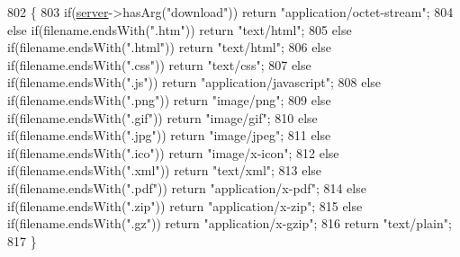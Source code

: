 \begin{DoxyCode}
802                                                  \{
803   \textcolor{keywordflow}{if}(\hyperlink{class_wi_fi_manager_a509523a01c0395cf0dc235b074f2a5ea}{server}->hasArg(\textcolor{stringliteral}{"download"})) \textcolor{keywordflow}{return} \textcolor{stringliteral}{"application/octet-stream"};
804   \textcolor{keywordflow}{else} \textcolor{keywordflow}{if}(filename.endsWith(\textcolor{stringliteral}{".htm"})) \textcolor{keywordflow}{return} \textcolor{stringliteral}{"text/html"};
805   \textcolor{keywordflow}{else} \textcolor{keywordflow}{if}(filename.endsWith(\textcolor{stringliteral}{".html"})) \textcolor{keywordflow}{return} \textcolor{stringliteral}{"text/html"};
806   \textcolor{keywordflow}{else} \textcolor{keywordflow}{if}(filename.endsWith(\textcolor{stringliteral}{".css"})) \textcolor{keywordflow}{return} \textcolor{stringliteral}{"text/css"};
807   \textcolor{keywordflow}{else} \textcolor{keywordflow}{if}(filename.endsWith(\textcolor{stringliteral}{".js"})) \textcolor{keywordflow}{return} \textcolor{stringliteral}{"application/javascript"};
808   \textcolor{keywordflow}{else} \textcolor{keywordflow}{if}(filename.endsWith(\textcolor{stringliteral}{".png"})) \textcolor{keywordflow}{return} \textcolor{stringliteral}{"image/png"};
809   \textcolor{keywordflow}{else} \textcolor{keywordflow}{if}(filename.endsWith(\textcolor{stringliteral}{".gif"})) \textcolor{keywordflow}{return} \textcolor{stringliteral}{"image/gif"};
810   \textcolor{keywordflow}{else} \textcolor{keywordflow}{if}(filename.endsWith(\textcolor{stringliteral}{".jpg"})) \textcolor{keywordflow}{return} \textcolor{stringliteral}{"image/jpeg"};
811   \textcolor{keywordflow}{else} \textcolor{keywordflow}{if}(filename.endsWith(\textcolor{stringliteral}{".ico"})) \textcolor{keywordflow}{return} \textcolor{stringliteral}{"image/x-icon"};
812   \textcolor{keywordflow}{else} \textcolor{keywordflow}{if}(filename.endsWith(\textcolor{stringliteral}{".xml"})) \textcolor{keywordflow}{return} \textcolor{stringliteral}{"text/xml"};
813   \textcolor{keywordflow}{else} \textcolor{keywordflow}{if}(filename.endsWith(\textcolor{stringliteral}{".pdf"})) \textcolor{keywordflow}{return} \textcolor{stringliteral}{"application/x-pdf"};
814   \textcolor{keywordflow}{else} \textcolor{keywordflow}{if}(filename.endsWith(\textcolor{stringliteral}{".zip"})) \textcolor{keywordflow}{return} \textcolor{stringliteral}{"application/x-zip"};
815   \textcolor{keywordflow}{else} \textcolor{keywordflow}{if}(filename.endsWith(\textcolor{stringliteral}{".gz"})) \textcolor{keywordflow}{return} \textcolor{stringliteral}{"application/x-gzip"};
816   \textcolor{keywordflow}{return} \textcolor{stringliteral}{"text/plain"};
817 \}
\end{DoxyCode}
